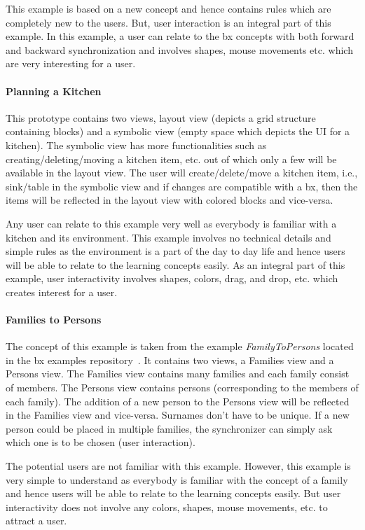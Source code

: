 This example is based on a new concept and hence contains rules which are completely new to the users. But, user interaction is an integral part of this example. In this example, a user can relate to the bx concepts with both forward and backward synchronization and involves shapes, mouse movements etc. which are very interesting for a user.

\paragraph{Planning a Kitchen}
This prototype contains two views, layout view (depicts a grid structure containing blocks) and a symbolic view (empty space which depicts the UI for a kitchen). The symbolic view has more functionalities such as creating/deleting/moving a kitchen item, etc. out of which only a few will be available in the layout view. The user will create/delete/move a kitchen item, i.e., sink/table in the symbolic view and if changes are compatible with a bx, then the items will be reflected in the layout view with colored blocks and vice-versa.

Any user can relate to this example very well as everybody is familiar with a kitchen and its environment. This example involves no technical details and simple rules as the environment is a part of the day to day life and hence users will be able to relate to the learning concepts easily. As an integral part of this example, user interactivity involves shapes, colors, drag, and drop, etc. which creates interest for a user.

\paragraph{Families to Persons}
The concept of this example is taken from the example \emph{FamilyToPersons} located in the bx examples repository~\cite{bx-examples}. It contains two views, a Families view and a Persons view. The Families view contains many families and each family consist of members. The Persons view contains persons (corresponding to the members of each family). The addition of a new person to the Persons view will be reflected in the Families view and vice-versa. Surnames don't have to be unique. If a new person could be placed in multiple families, the synchronizer can simply ask which one is to be chosen (user interaction).

The potential users are not familiar with this example. However, this example is very simple to understand as everybody is familiar with the concept of a family and hence users will be able to relate to the learning concepts easily. But user interactivity does not involve any colors, shapes, mouse movements, etc. to attract a user.

